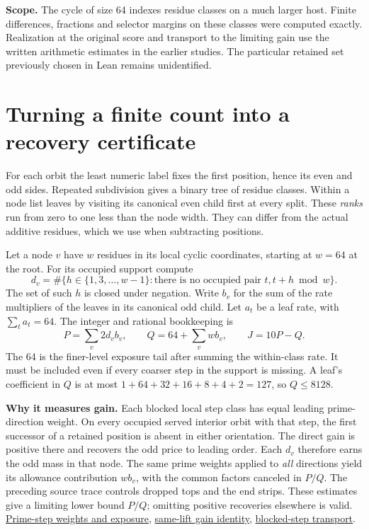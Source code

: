 \documentclass[12pt,letterpaper]{article}
\newcommand{\para}[1]{\par\medskip\noindent\textbf{#1}\quad}
\newcommand{\pagepart}[1]{\clearpage\section{#1}}
\begin{document}
\para{Scope.} The cycle of size 64 indexes residue classes on a much larger host. Finite differences, fractions and selector margins on these classes were computed exactly. Realization at the original score and transport to the limiting gain use the written arithmetic estimates in the earlier studies. The particular retained set previously chosen in Lean remains unidentified.

\pagepart{Turning a finite count into a recovery certificate}
For each orbit the least numeric label fixes the first position, hence its even and odd sides. Repeated subdivision gives a binary tree of residue classes. Within a node list leaves by visiting its canonical even child first at every split. These \emph{ranks} run from zero to one less than the node width. They can differ from the actual additive residues, which we use when subtracting positions.

Let a node \(v\) have \(w\) residues in its local cyclic coordinates, starting at \(w=64\) at the root. For its occupied support compute
\[
  d_v=\#\{h\in\{1,3,\ldots,w-1\}:
              \text{there is no occupied pair } t,t+h\bmod w\}.
\]
The set of such \(h\) is closed under negation. Write \(b_v\) for the sum of the rate multipliers of the leaves in its canonical odd child. Let \(a_t\) be a leaf rate, with \(\sum_t a_t=64\). The integer and rational bookkeeping is
\[
 P=\sum_v 2d_v b_v,\qquad Q=64+\sum_v w b_v,\qquad J=10P-Q.
\]
The 64 is the finer-level exposure tail after summing the within-class rate. It must be included even if every coarser step in the support is missing. A leaf's coefficient in \(Q\) is at most \(1+64+32+16+8+4+2=127\), so \(Q\le8128\).

\para{Why it measures gain.} Each blocked local step class has equal leading prime-direction weight. On every occupied served interior orbit with that step, the first successor of a retained position is absent in either orientation. The direct gain is positive there and recovers the odd price to leading order. Each \(d_v\) therefore earns the odd mass in that node. The same prime weights applied to \emph{all} directions yield its allowance contribution \(w b_v\), with the common factors canceled in \(P/Q\). The preceding source trace controls dropped tops and the end strips. These estimates give a limiting lower bound \(P/Q\); omitting positive recoveries elsewhere is valid. \href{https://github.com/nousentllc/riemann-hypothesis/pull/10}{Prime-step weights and exposure}, \href{https://github.com/nousentllc/riemann-hypothesis/pull/11}{same-lift gain identity}, \href{https://github.com/nousentllc/riemann-hypothesis/pull/12}{blocked-step transport}.
\end{document}
